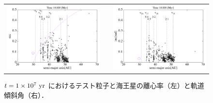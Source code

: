 \documentclass[11pt,a4paper,oneside,onecolumn]{jreport}
\begin{document}
\begin{figure}[H]
\begin{tabular}{ccc}
\begin{minipage}[t]{0.45\hsize}
\centering
\includegraphics[width=8cm]{./image/kuiper_ecc_10Myr.pdf}
\end{minipage} &
\begin{minipage}[t]{0.1\hsize}
\end{minipage} &
\begin{minipage}[t]{0.45\hsize}
\centering
\includegraphics[width=8cm]{./image/kuiper_inc_10Myr.pdf}
\end{minipage}\\
%
\end{tabular}
\caption{$t = 1 \times 10^7\ {\rm yr}$ におけるテスト粒子と海王星の離心率（左）と軌道傾斜角（右）．\label{fig:kuiper_ecc_inc_10Myr}}
\end{figure}
\end{document}

